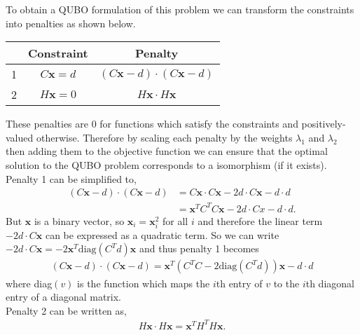 \documentclass{article}
\begin{document}
\noindent To obtain a QUBO formulation of this problem we can transform the constraints into penalties as shown below.
\begin{center}
\begin{tabular}{ |c|c|c| } 
 \hline
   & Constraint  & Penalty \\ 
 \hline
 1 & \(C\mathbf{x} = d\) & \((C\mathbf{x} - d)\cdot(C\mathbf{x} - d)\) \\ 
 2 & \(H\mathbf{x} = 0\) & \(H \mathbf{x} \cdot H \mathbf{x} \) \\ 
 \hline
\end{tabular}
\end{center}
These penalties are 0 for functions which satisfy the constraints and positively-valued otherwise. Therefore by scaling each penalty by the weights \(\lambda_1\) and \(\lambda_2\) then adding them to the objective function we can ensure that the optimal solution to the QUBO problem corresponds to a isomorphism (if it exists).\\

\noindent Penalty 1 can be simplified to,
\begin{align*}
    (C\mathbf{x} - d)\cdot (C\mathbf{x} - d) &= C\mathbf{x} \cdot C\mathbf{x} - 2d\cdot C\mathbf{x} - d\cdot d \\
    &= \mathbf{x}^T C^T C \mathbf{x} - 2d\cdot Cx - d\cdot d.
\end{align*}
But \(\mathbf{x}\) is a binary vector, so \(\mathbf{x}_i = \mathbf{x}_i^2\) for all \(i\) and therefore the linear term \(-2d\cdot C\mathbf{x}\) can be expressed as a quadratic term. So we can write \(-2d\cdot C \mathbf{x} = -2\mathbf{x}^T\text{diag}(C^Td)\mathbf{x}\) and thus penalty 1 becomes
\begin{align*}
    (C\mathbf{x} - d)\cdot (C\mathbf{x} - d) = \mathbf{x}^T( C^T C -2\text{diag}(C^T d))\mathbf{x} - d\cdot d
\end{align*}
where diag\((v)\) is the function which maps the \(i\)th entry of \(v\) to the \(i\)th diagonal entry of a diagonal matrix.\\

\noindent Penalty 2 can be written as,
\begin{align*}
    H\mathbf{x} \cdot H\mathbf{x} = \mathbf{x}^T H^T H \mathbf{x}.
\end{align*}
\end{document}
